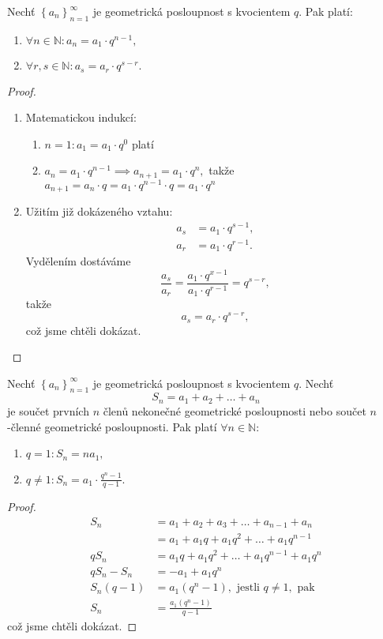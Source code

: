 \begin{veta}
    Nechť $\left \{ a_n \right \}_{n=1}^\infty $ je geometrická posloupnost s kvocientem
    $q$. Pak platí:
    \begin{enumerate}[$i.$]
    \item $\forall n\in \mathbb N: a_n = a_1 \cdot q^{n-1},$
   	\item $\forall r,s \in \mathbb N: a_s = a_r \cdot q^{s-r}.$
    \end{enumerate}
\end{veta}

\begin{proof}
\begin{enumerate}[$i.$]
\item Matematickou indukcí:
\begin{enumerate}[1.]
\item $n=1: a_1 = a_1\cdot q^0$ platí
\item $a_n = a_1\cdot q^{n-1}\implies a_{n+1}=a_1\cdot q^n,$ takže $a_{n+1}=a_n\cdot q=a_1\cdot q^{n-1}\cdot q=a_1\cdot q^n$
\end{enumerate}
\item Užitím již dokázeného vztahu:
\begin{align*}
    a_s &= a_1\cdot q^{s-1},\\
    a_r &= a_1\cdot q^{r-1}.
\end{align*}
Vydělením dostáváme
$$\frac{a_s}{a_r} = \frac{a_1\cdot q^{x-1}}{a_1\cdot q^{r-1}}=q^{s-r},$$
takže
$$a_s=a_r\cdot q^{s-r},$$
což jsme chtěli dokázat.\qedhere
\end{enumerate}
\end{proof}

\begin{veta}
Nechť $\left \{ a_n \right \}_{n=1}^\infty $ je geometrická posloupnost s kvocientem
$q$. Nechť
$$S_n=a_1+a_2+\dots+a_n$$
je součet prvních $n$ členů nekonečné geometrické posloupnosti nebo součet
$n$-členné geometrické posloupnosti. Pak platí $\forall n \in \mathbb N$:
\begin{enumerate}[$i.$]
\item $q=1: S_n=na_1,$
\item $q\ne 1: S_n = a_1\cdot \frac{q^n-1}{q-1}.$
\end{enumerate}
\end{veta}

\begin{proof}
\begin{align*}
    S_n &= a_1+a_2+a_3+\dots+a_{n-1}+a_n \\
    &= a_1 + a_1q+ a_1q^2+ \dots + a_1q^{n-1}\\
    qS_n &= a_1q + a_1q^2 +  \dots + a_1q^{n-1} + a_1q^n\\
    qS_n-S_n &= -a_1+a_1q^n\\
    S_n(q-1) &= a_1(q^n-1), \textrm{ jestli } q\ne 1, \textrm{ pak}\\
    S_n &= \frac{a_1(q^n-1)}{q-1}
\end{align*}
což jsme chtěli dokázat. \qedhere
\end{proof}

